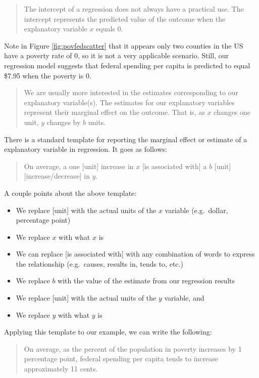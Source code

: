 \documentclass[
]{book}
\providecommand{\tightlist}{%
  \setlength{\itemsep}{0pt}\setlength{\parskip}{0pt}}
\begin{document}
\begin{quote}
The intercept of a regression does not always have a practical use. The intercept represents the predicted value of the outcome when the explanatory variable \(x\) equals 0.
\end{quote}

Note in Figure \ref{fig:povfedscatter} that it appears only two counties in the US have a poverty rate of 0, so it is not a very applicable scenario. Still, our regression model suggests that federal spending per capita is predicted to equal \$7.95 when the poverty is 0.

\begin{quote}
We are usually more interested in the estimates corresponding to our explanatory variable(s). The estimates for our explanatory variables represent their marginal effect on the outcome. That is, as \(x\) changes one unit, \(y\) changes by \(b\) units.
\end{quote}

There is a standard template for reporting the marginal effect or estimate of a explanatory variable in regression. It goes as follows:

\begin{quote}
On average, a one {[}unit{]} increase in \(x\) {[}is associated with{]} a \(b\) {[}unit{]} {[}increase/decrease{]} in \(y\).
\end{quote}

A couple points about the above template:

\begin{itemize}
\tightlist
\item
  We replace {[}unit{]} with the actual units of the \(x\) variable (e.g.~dollar, percentage point)
\item
  We replace \(x\) with what \(x\) is
\item
  We can replace {[}is associated with{]} with any combination of words to express the relationship (e.g.~causes, results in, tends to, etc.)
\item
  We replace \(b\) with the value of the estimate from our regression results
\item
  We replace {[}unit{]} with the actual units of the \(y\) variable, and
\item
  We replace \(y\) with what \(y\) is
\end{itemize}

Applying this template to our example, we can write the following:

\begin{quote}
On average, as the percent of the population in poverty increases by 1 percentage point, federal spending per capita tends to increase approximately 11 cents.
\end{quote}
\end{document}

